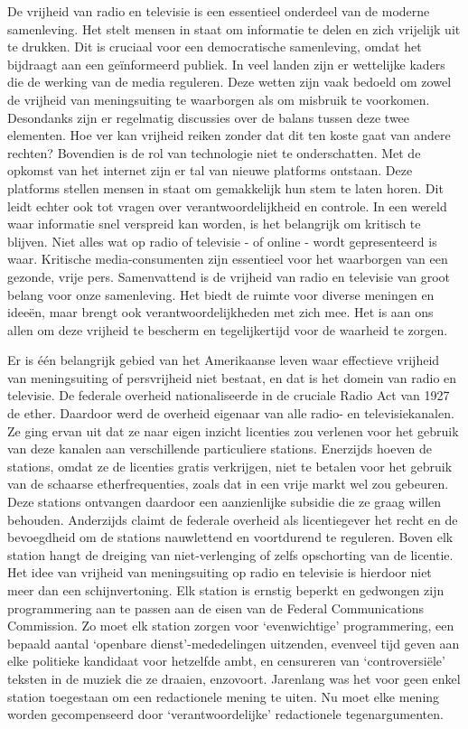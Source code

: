 \documentclass[
  a5paper,
  smalldemyvopaper,10pt,twoside,onecolumn,openright,extrafontsizes,hidelinks]{memoir}
\begin{document}
De vrijheid van radio en televisie is een essentieel onderdeel van de
moderne samenleving. Het stelt mensen in staat om informatie te delen en
zich vrijelijk uit te drukken. Dit is cruciaal voor een democratische
samenleving, omdat het bijdraagt aan een geïnformeerd publiek. In veel
landen zijn er wettelijke kaders die de werking van de media reguleren.
Deze wetten zijn vaak bedoeld om zowel de vrijheid van meningsuiting te
waarborgen als om misbruik te voorkomen. Desondanks zijn er regelmatig
discussies over de balans tussen deze twee elementen. Hoe ver kan
vrijheid reiken zonder dat dit ten koste gaat van andere rechten?
Bovendien is de rol van technologie niet te onderschatten. Met de
opkomst van het internet zijn er tal van nieuwe platforms ontstaan. Deze
platforms stellen mensen in staat om gemakkelijk hun stem te laten
horen. Dit leidt echter ook tot vragen over verantwoordelijkheid en
controle. In een wereld waar informatie snel verspreid kan worden, is
het belangrijk om kritisch te blijven. Niet alles wat op radio of
televisie - of online - wordt gepresenteerd is waar. Kritische
media-consumenten zijn essentieel voor het waarborgen van een gezonde,
vrije pers. Samenvattend is de vrijheid van radio en televisie van groot
belang voor onze samenleving. Het biedt de ruimte voor diverse meningen
en ideeën, maar brengt ook verantwoordelijkheden met zich mee. Het is
aan ons allen om deze vrijheid te bescherm en tegelijkertijd voor de
waarheid te zorgen.

Er is één belangrijk gebied van het Amerikaanse leven waar effectieve
vrijheid van meningsuiting of persvrijheid niet bestaat, en dat is het
domein van radio en televisie. De federale overheid nationaliseerde in
de cruciale Radio Act van 1927 de ether. Daardoor werd de overheid
eigenaar van alle radio- en televisiekanalen. Ze ging ervan uit dat ze
naar eigen inzicht licenties zou verlenen voor het gebruik van deze
kanalen aan verschillende particuliere stations. Enerzijds hoeven de
stations, omdat ze de licenties gratis verkrijgen, niet te betalen voor
het gebruik van de schaarse etherfrequenties, zoals dat in een vrije
markt wel zou gebeuren. Deze stations ontvangen daardoor een
aanzienlijke subsidie die ze graag willen behouden. Anderzijds claimt de
federale overheid als licentiegever het recht en de bevoegdheid om de
stations nauwlettend en voortdurend te reguleren. Boven elk station
hangt de dreiging van niet-verlenging of zelfs opschorting van de
licentie. Het idee van vrijheid van meningsuiting op radio en televisie
is hierdoor niet meer dan een schijnvertoning. Elk station is ernstig
beperkt en gedwongen zijn programmering aan te passen aan de eisen van
de Federal Communications Commission. Zo moet elk station zorgen voor
`evenwichtige' programmering, een bepaald aantal `openbare
dienst'-mededelingen uitzenden, evenveel tijd geven aan elke politieke
kandidaat voor hetzelfde ambt, en censureren van `controversiële'
teksten in de muziek die ze draaien, enzovoort. Jarenlang was het voor
geen enkel station toegestaan om een redactionele mening te uiten. Nu
moet elke mening worden gecompenseerd door `verantwoordelijke'
redactionele tegenargumenten.
\end{document}
